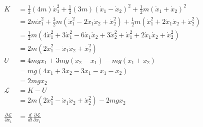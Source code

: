 \documentclass{article}
\begin{document}
\setcounter{subsection}{26}
\subsection{}

\begin{align*}
  K                                         & = \frac{1}{2} (4 m) \dot{x}_1^2 + \frac{1}{2} (3 m) (\dot{x}_1 - \dot{x}_2)^2 + \frac{1}{2} m (\dot{x}_1 + \dot{x}_2)^2                                   \\
                                            & = 2 m \dot{x}_1^2 + \frac{3}{2} m (\dot{x}_1^2 - 2 \dot{x}_1 \dot{x}_2 + \dot{x}_2^2) + \frac{1}{2} m (\dot{x}_1^2 + 2 \dot{x}_1 \dot{x}_2 + \dot{x}_2^2) \\
                                            & = \frac{1}{2} m (4 \dot{x}_1^2 + 3 \dot{x}_1^2 - 6 \dot{x}_1 \dot{x}_2 + 3 \dot{x}_2^2 + \dot{x}_1^2 + 2 \dot{x}_1 \dot{x}_2 + \dot{x}_2^2)               \\
                                            & = 2 m (2 \dot{x}_1^2 - \dot{x}_1 \dot{x}_2 + \dot{x}_2^2)                                                                                                 \\
  U                                         & = 4 m g x_1 + 3 m g (x_2 - x_1) - m g (x_1 + x_2)                                                                                                         \\
                                            & = m g (4 x_1 + 3 x_2 - 3 x_1 - x_1 - x_2)                                                                                                                 \\
                                            & = 2 m g x_2                                                                                                                                               \\
  \mathcal{L}                               & = K - U                                                                                                                                                   \\
                                            & = 2 m (2 \dot{x}_1^2 - \dot{x}_1 \dot{x}_2 + \dot{x}_2^2) - 2 m g x_2                                                                                     \\ \\
  \frac{\partial \mathcal{L}}{\partial x_1} & = \frac{d}{d t} \frac{\partial \mathcal{L}}{\partial \dot{x}_1}                                                                                           \\

\end{align*}
\end{document}
